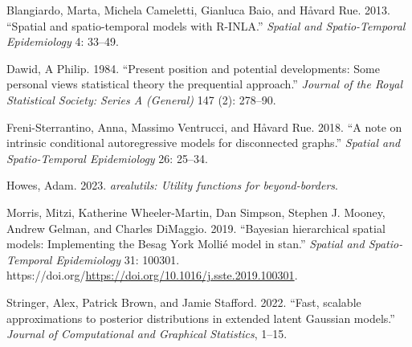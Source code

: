 \documentclass[
  12pt,
]{article}
\newlength{\cslhangindent}
\newenvironment{CSLReferences}[2] %
 {\begin{list}{}{%
  \setlength{\itemindent}{0pt}
  \setlength{\leftmargin}{0pt}
  \setlength{\parsep}{0pt}
  \ifodd #1
   \setlength{\leftmargin}{\cslhangindent}
   \setlength{\itemindent}{-1\cslhangindent}
  \fi
  \setlength{\itemsep}{#2\baselineskip}}}
 {\end{list}}
\begin{document}
\label{refs}
\begin{CSLReferences}{1}{0}
Blangiardo, Marta, Michela Cameletti, Gianluca Baio, and Håvard Rue.
2013. {``{Spatial and spatio-temporal models with R-INLA}.''}
\emph{Spatial and Spatio-Temporal Epidemiology} 4: 33--49.

Dawid, A Philip. 1984. {``{Present position and potential developments:
Some personal views statistical theory the prequential approach}.''}
\emph{Journal of the Royal Statistical Society: Series A (General)} 147
(2): 278--90.

Freni-Sterrantino, Anna, Massimo Ventrucci, and Håvard Rue. 2018. {``{A
note on intrinsic conditional autoregressive models for disconnected
graphs}.''} \emph{Spatial and Spatio-Temporal Epidemiology} 26: 25--34.

Howes, Adam. 2023. \emph{{arealutils: Utility functions for
beyond-borders}}.

Morris, Mitzi, Katherine Wheeler-Martin, Dan Simpson, Stephen J. Mooney,
Andrew Gelman, and Charles DiMaggio. 2019. {``{Bayesian hierarchical
spatial models: Implementing the Besag York Mollié model in stan}.''}
\emph{Spatial and Spatio-Temporal Epidemiology} 31: 100301.
https://doi.org/\url{https://doi.org/10.1016/j.sste.2019.100301}.

Stringer, Alex, Patrick Brown, and Jamie Stafford. 2022. {``{Fast,
scalable approximations to posterior distributions in extended latent
Gaussian models}.''} \emph{Journal of Computational and Graphical
Statistics}, 1--15.

\end{CSLReferences}
\end{document}
